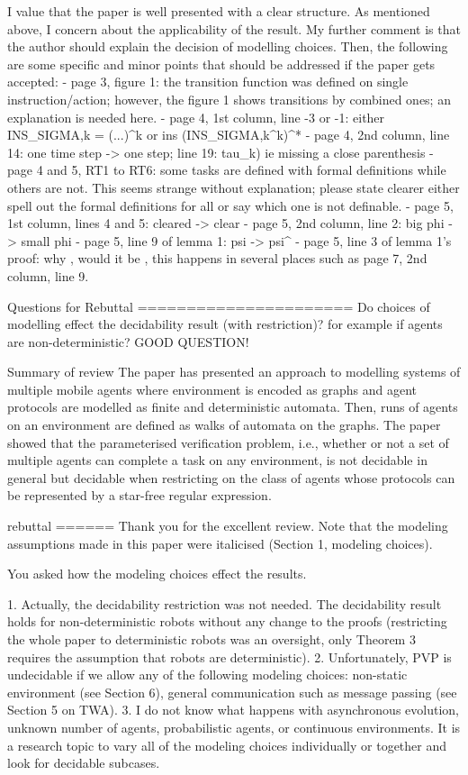 I value that the paper is well presented with a clear structure. As mentioned above, I concern about the applicability of the result. My further comment is that the author should explain the decision of modelling choices. Then, the following are some specific and minor points that should be addressed if the paper gets accepted:
- page 3, figure 1: the transition function was defined on single instruction/action; however, the figure 1 shows transitions by combined ones; an explanation is needed here.
- page 4, 1st column, line -3 or -1: either INS_{SIGMA,k} = (...)^k or ins \in (INS_{SIGMA,k}^k)^*
- page 4, 2nd column, line 14: one time step -> one step; line 19: tau_k) ie missing a close parenthesis
- page 4 and 5, RT1 to RT6: some tasks are defined with formal definitions while others are not. This seems strange without explanation; please state clearer either spell out the formal definitions for all or say which one is not definable.
- page 5, 1st column, lines 4 and 5: cleared -> clear
- page 5, 2nd column, line 2: big phi -> small phi
- page 5, line 9 of lemma 1: psi -> psi^\infty
- page 5, line 3 of lemma 1's proof: why \subset, would it be \subseteq, this happens in several places such as page 7, 2nd column, line 9.

Questions for Rebuttal
======================
Do choices of modelling effect the decidability result (with restriction)? for example if agents are non-deterministic?
GOOD QUESTION!

Summary of review
The paper has presented an approach to modelling systems of multiple mobile agents where environment is encoded as graphs and agent protocols are modelled as finite and deterministic automata. Then, runs of agents on an environment are defined as walks of automata on the graphs. The paper showed that the parameterised verification problem, i.e., whether or not a set of multiple agents can complete a task on any environment, is not decidable in general but decidable when restricting on the class of agents whose protocols can be represented by a star-free regular expression.

rebuttal
======
Thank you for the excellent review.  Note that the modeling assumptions made in this paper were italicised (Section 1, modeling choices).

You asked how the modeling choices effect the results. 

1. Actually, the decidability restriction was not needed. The decidability result holds for non-deterministic robots without any change to the proofs (restricting the whole paper to deterministic robots was an oversight, only Theorem 3 requires the assumption that robots are deterministic). 
2. Unfortunately, PVP is undecidable if we allow any of the following modeling choices: non-static environment (see Section 6), general communication such as message passing (see Section 5 on TWA).
3. I do not know what happens with asynchronous evolution, unknown number of agents, probabilistic agents, or continuous environments. It is a research topic to vary all of the modeling choices individually or together and look for decidable subcases.